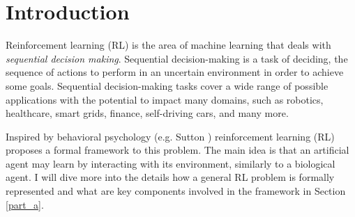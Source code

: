 \section*{Introduction}
\label{sec:intro}
Reinforcement learning (RL) is the area of machine learning that deals
with {\em sequential decision making}.
Sequential decision-making is a task of deciding, the sequence of actions
to perform in an uncertain environment in order to achieve some
goals. Sequential decision-making tasks cover a wide range of possible
applications with the potential to impact many domains, such as
robotics, healthcare, smart grids, finance, self-driving cars, and many
more.

Inspired by behavioral psychology (e.g. Sutton \cite{sutton1984temporal}) reinforcement
learning (RL) proposes a formal framework to this problem.
The main idea is that an artificial agent may learn by interacting with
its environment, similarly to a biological agent.
I will dive more into the details how a general RL problem is formally represented and what are key components involved in the framework in Section \ref{part_a}.





